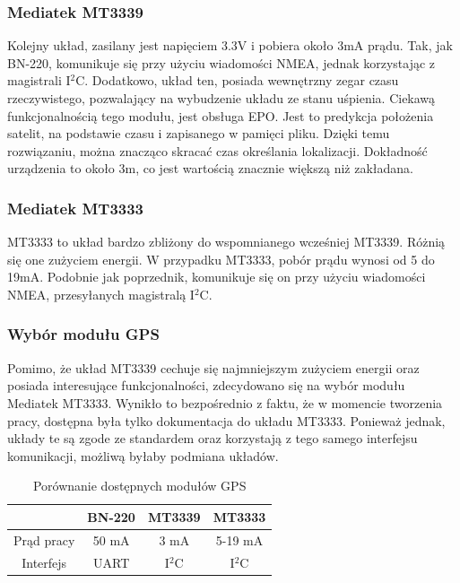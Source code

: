 \subsubsection{Mediatek MT3339}
Kolejny układ, zasilany jest napięciem 3.3V i pobiera około 3mA prądu. Tak, jak BN-220, komunikuje się przy użyciu wiadomości NMEA, jednak korzystając z magistrali I$^{2}$C. Dodatkowo, układ ten, posiada wewnętrzny zegar czasu rzeczywistego, pozwalający na wybudzenie układu ze stanu uśpienia. Ciekawą funkcjonalnością tego modułu, jest obsługa EPO. Jest to predykcja położenia satelit, na podstawie czasu i zapisanego w pamięci pliku. Dzięki temu rozwiązaniu, można znacząco skracać czas określania lokalizacji. Dokładność urządzenia to około 3m, co jest wartością znacznie większą niż zakładana.\cite{MT3339}

\subsubsection{Mediatek MT3333}
MT3333 to układ bardzo zbliżony do wspomnianego wcześniej MT3339. Różnią się one zużyciem energii. W przypadku MT3333, pobór prądu wynosi od 5 do 19mA. Podobnie jak poprzednik, komunikuje się on przy użyciu wiadomości NMEA, przesyłanych magistralą I$^{2}$C.\cite{MT3333}

\subsubsection{Wybór modułu GPS}
Pomimo, że układ MT3339 cechuje się najmniejszym zużyciem energii oraz posiada interesujące funkcjonalności, zdecydowano się na wybór modułu Mediatek MT3333. Wynikło to bezpośrednio z faktu, że w momencie tworzenia pracy, dostępna była tylko dokumentacja do układu MT3333. Ponieważ jednak, układy te są zgode ze standardem oraz korzystają z tego samego interfejsu komunikacji, możliwą byłaby podmiana układów.

\begin{table}[h]
    \centering
    \begin{tabular}{|c | c | c | c|}
        \hline
         & BN-220 & MT3339 & MT3333 \\
        \hline
        Prąd pracy  & 50 mA & 3 mA &5-19 mA \\
        \hline
        Interfejs & UART & I$^{2}$C & I$^{2}$C\\
        \hline
    \end{tabular}
    \caption{Porównanie dostępnych modułów GPS}
    \label{tab:gps}
    \end{table}


